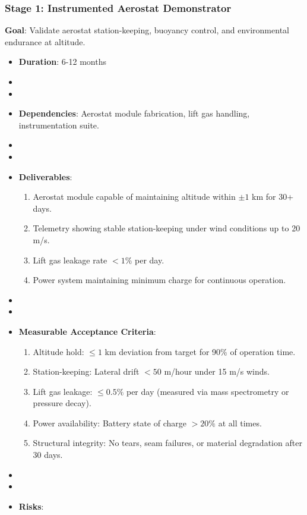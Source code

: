 \subsubsection{Stage 1: Instrumented Aerostat Demonstrator}
\textbf{Goal}: Validate aerostat station-keeping, buoyancy control, and environmental endurance at altitude.
\begin{itemize}
    \item \textbf{Duration}: 6-12 months
    \item \item \item \textbf{Dependencies}: Aerostat module fabrication, lift gas handling, instrumentation suite.
    \item \item \item \textbf{Deliverables}: 
        \begin{enumerate}
            \item Aerostat module capable of maintaining altitude within $\pm 1$ km for 30+ days.
            \item Telemetry showing stable station-keeping under wind conditions up to 20 m/s.
            \item Lift gas leakage rate $< 1\%$ per day.
            \item Power system maintaining minimum charge for continuous operation.
        \end{enumerate}
    \item \item \item \textbf{Measurable Acceptance Criteria}:
        \begin{enumerate}
            \item Altitude hold: $\leq 1$ km deviation from target for 90\% of operation time.
            \item Station-keeping: Lateral drift $< 50$ m/hour under 15 m/s winds.
            \item Lift gas leakage: $\leq 0.5\%$ per day (measured via mass spectrometry or pressure decay).
            \item Power availability: Battery state of charge $> 20\%$ at all times.
            \item Structural integrity: No tears, seam failures, or material degradation after 30 days.
        \end{enumerate}
    \item \item \item \textbf{Risks}: 

\end{itemize}
